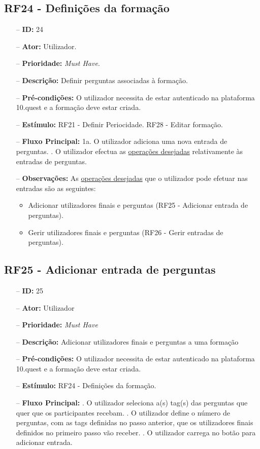 \subsection{RF24 - Definições da formação}
\begin{itemize}
	\item[--] \textbf{ID:} 24
	\item[--]  \textbf{Ator:} Utilizador.
	\item[--]  \textbf{Prioridade:} \textit{Must Have}.
	\item[--]  \textbf{Descrição:} Definir perguntas associadas à formação.
	\item[--]  \textbf{Pré-condições:} O utilizador necessita de estar autenticado na plataforma 10.quest e a formação deve estar criada.
	\item[--]  \textbf{Estímulo:}
	\subitem RF21 - Definir Periocidade.
	\subitem RF28 - Editar formação.
	\item[--]  \textbf{Fluxo Principal:} 
	\subitem 1a. O utilizador adiciona uma nova entrada de perguntas.
	. O utilizador efectua as \underline{operações desejadas} relativamente às entradas de perguntas.
	\item[--]  \textbf{Observações:} As \underline{operações desejadas} que o utilizador pode efetuar nas entradas são as seguintes:
	\begin{itemize}
		\item Adicionar utilizadores finais e perguntas (RF25 - Adicionar entrada de perguntas).
		\item Gerir utilizadores finais e perguntas (RF26 - Gerir entradas de perguntas).
	\end{itemize}
\end{itemize}
\newpage

\subsection{RF25 - Adicionar entrada de perguntas}
\begin{itemize}
	\item[--] \textbf{ID:} 25
	\item[--]  \textbf{Ator:} Utilizador
	\item[--]  \textbf{Prioridade:} \textit{Must Have}
	\item[--]  \textbf{Descrição:} Adicionar utilizadores finais e perguntas a uma formação
	\item[--]  \textbf{Pré-condições:} O utilizador necessita de estar autenticado na plataforma 10.quest e a formação deve estar criada.
	\item[--]  \textbf{Estímulo:} RF24 - Definições da formação.
	\item[--]  \textbf{Fluxo Principal:} 
		. O utilizador seleciona a(s) tag(s) das perguntas que quer que os participantes recebam.
		. O utilizador define o número de perguntas, com as tags definidas no passo anterior, que os utilizadores finais definidos no primeiro passo vão receber.
		. O utilizador carrega no botão para adicionar entrada.
\end{itemize}
\newpage

